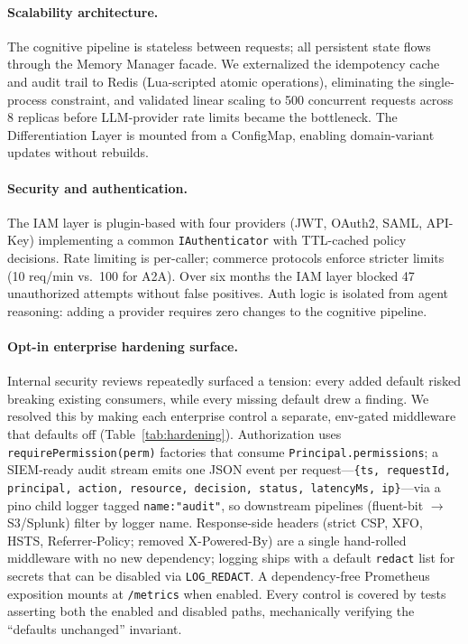 \documentclass[11pt]{article}
\begin{document}
\paragraph{Scalability architecture.} The cognitive pipeline is stateless between requests; all persistent state flows through the Memory Manager facade. We externalized the idempotency cache and audit trail to Redis (Lua-scripted atomic operations), eliminating the single-process constraint, and validated linear scaling to 500 concurrent requests across 8 replicas before LLM-provider rate limits became the bottleneck. The Differentiation Layer is mounted from a ConfigMap, enabling domain-variant updates without rebuilds.

\paragraph{Security and authentication.} The IAM layer is plugin-based with four providers (JWT, OAuth2, SAML, API-Key) implementing a common \texttt{IAuthenticator} with TTL-cached policy decisions. Rate limiting is per-caller; commerce protocols enforce stricter limits (10 req/min vs.\ 100 for A2A). Over six months the IAM layer blocked 47 unauthorized attempts without false positives. Auth logic is isolated from agent reasoning: adding a provider requires zero changes to the cognitive pipeline.

\paragraph{Opt-in enterprise hardening surface.} Internal security reviews repeatedly surfaced a tension: every added default risked breaking existing consumers, while every missing default drew a finding. We resolved this by making each enterprise control a separate, env-gated middleware that defaults off (Table~\ref{tab:hardening}). Authorization uses \texttt{requirePermission(perm)} factories that consume \texttt{Principal.permissions}; a SIEM-ready audit stream emits one JSON event per request---\texttt{\{ts, requestId, principal, action, resource, decision, status, latencyMs, ip\}}---via a pino child logger tagged \texttt{name:"audit"}, so downstream pipelines (fluent-bit $\to$ S3/Splunk) filter by logger name. Response-side headers (strict CSP, XFO, HSTS, Referrer-Policy; removed X-Powered-By) are a single hand-rolled middleware with no new dependency; logging ships with a default \texttt{redact} list for secrets that can be disabled via \texttt{LOG\_REDACT}. A dependency-free Prometheus exposition mounts at \texttt{/metrics} when enabled. Every control is covered by tests asserting both the enabled and disabled paths, mechanically verifying the ``defaults unchanged'' invariant.
\end{document}

